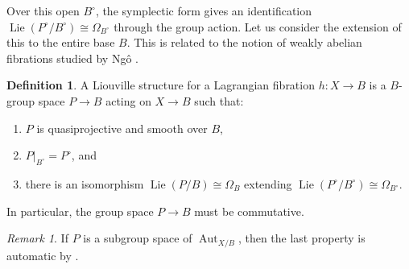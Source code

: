 \documentclass{amsart}
\theoremstyle{plain}
\theoremstyle{definition}
\newtheorem{definition}{Definition}[section]
\theoremstyle{remark}
\newtheorem{remark}[theorem]{Remark}
\begin{document}
Over this open $B^\circ$, the symplectic form gives an identification $\operatorname{Lie}(P^\circ/B^\circ)\cong\Omega_{B^\circ}$ through the group action.
Let us consider the extension of this to the entire base $B$.
This is related to the notion of weakly abelian fibrations studied by Ng\^o \cite{ngo}.

\begin{definition}
    A Liouville structure for a Lagrangian fibration $h:X\to B$ is a $B$-group space $P\to B$ acting on $X\to B$ such that:
    \begin{enumerate}
        \item $P$ is quasiprojective and smooth over $B$,
        \item $P|_{B^\circ}=P^\circ$, and
        \item there is an isomorphism $\operatorname{Lie}(P/B)\cong\Omega_B$ extending $\operatorname{Lie}(P^\circ/B^\circ)\cong\Omega_{B^\circ}$.
    \end{enumerate}
\end{definition}
In particular, the group space $P\to B$ must be commutative.
\begin{remark}
    If $P$ is a subgroup space of $\operatorname{Aut}_{X/B}$, then the last property is automatic by \cite[Theorem 4.8]{kim_neron}.
\end{remark}
\end{document}
